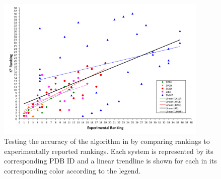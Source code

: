 \begin{figure}\label{fig:rankings}
\center
\includegraphics[width=0.9\textwidth]{figures/Rankings.png}
\caption{Testing the accuracy of the \ks algorithm in  by comparing \ks rankings to experimentally reported rankings. Each system is represented by its corresponding PDB ID and a linear trendline is shown for each in its corresponding color according to the legend.}
\end{figure}

